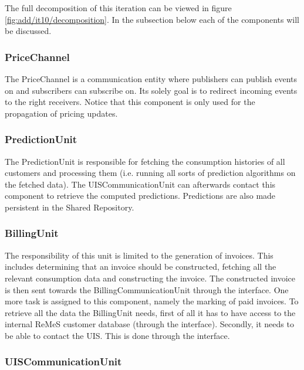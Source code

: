 \npar The full decomposition of this iteration can be viewed in figure
\ref{fig:add/it10/decomposition}. In the subsection below each of the components
will be discussed. 

\subsubsection{PriceChannel}

\npar The PriceChannel is a communication entity where publishers can publish
events on and subscribers can subscribe on. Its solely goal is to redirect
incoming events to the right receivers. Notice that this component is only used
for the propagation of pricing updates.

\subsubsection{PredictionUnit}

\npar The PredictionUnit is responsible for fetching the consumption
histories of all customers and processing them (i.e. running all sorts of
prediction algorithms on the fetched data). The UISCommunicationUnit can
afterwards contact this component to retrieve the computed predictions.
Predictions are also made persistent in the Shared Repository.

\subsubsection{BillingUnit}

\npar The responsibility of this unit is limited to the generation of invoices.
This includes determining that an invoice should be constructed, fetching all
the relevant consumption data and constructing the invoice. The constructed
invoice is then sent towards the BillingCommunicationUnit through the
 interface. One more task is assigned to this
component, namely the marking of paid invoices. To retrieve all the data the
BillingUnit needs, first of all it has to have access to the internal ReMeS
customer database (through the  interface).
Secondly, it needs to be able to contact the UIS. This is done through the
 interface.

\subsubsection{UISCommunicationUnit}

